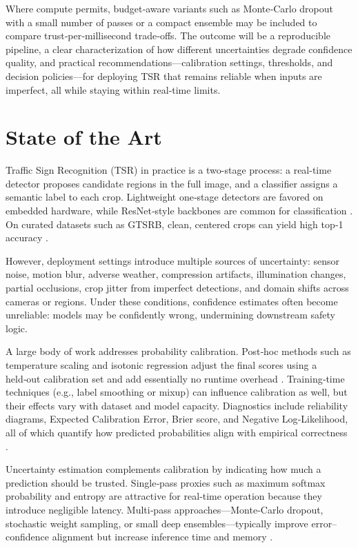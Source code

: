 \documentclass[11pt,a4paper]{article}
\begin{document}
Where compute permits, budget‑aware variants such as Monte‑Carlo dropout with a small number of passes or a compact ensemble may be included to compare trust‑per‑millisecond trade‑offs. The outcome will be a reproducible pipeline, a clear characterization of how different uncertainties degrade confidence quality, and practical recommendations—calibration settings, thresholds, and decision policies—for deploying TSR that remains reliable when inputs are imperfect, all while staying within real‑time limits.

\section{State of the Art}

Traffic Sign Recognition (TSR) in practice is a two-stage process: a real-time detector proposes candidate regions in the full image, and a classifier assigns a semantic label to each crop. Lightweight one‑stage detectors are favored on embedded hardware, while ResNet‑style backbones are common for classification \cite{stallkamp2011gtsrb,he2016deep,redmon2018yolov3}. On curated datasets such as GTSRB, clean, centered crops can yield high top‑1 accuracy \cite{stallkamp2011gtsrb}.

However, deployment settings introduce multiple sources of uncertainty: sensor noise, motion blur, adverse weather, compression artifacts, illumination changes, partial occlusions, crop jitter from imperfect detections, and domain shifts across cameras or regions. Under these conditions, confidence estimates often become unreliable: models may be confidently wrong, undermining downstream safety logic.

A large body of work addresses probability calibration. Post‑hoc methods such as temperature scaling and isotonic regression adjust the final scores using a held‑out calibration set and add essentially no runtime overhead \cite{guo2017calibration,niculescu2005predicting}. Training‑time techniques (e.g., label smoothing or mixup) can influence calibration as well, but their effects vary with dataset and model capacity. Diagnostics include reliability diagrams, Expected Calibration Error, Brier score, and Negative Log‑Likelihood, all of which quantify how predicted probabilities align with empirical correctness \cite{niculescu2005predicting,guo2017calibration}.

Uncertainty estimation complements calibration by indicating how much a prediction should be trusted. Single‑pass proxies such as maximum softmax probability and entropy are attractive for real‑time operation because they introduce negligible latency. Multi‑pass approaches—Monte‑Carlo dropout, stochastic weight sampling, or small deep ensembles—typically improve error–confidence alignment but increase inference time and memory \cite{gal2016dropout,lakshminarayanan2017simple}.
\end{document}
